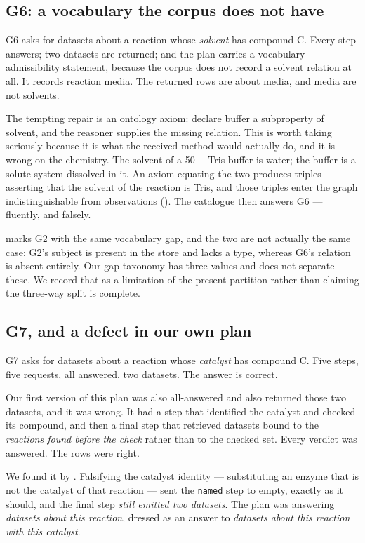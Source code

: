 \documentclass[11pt,a4paper]{article}
\theoremstyle{plain}
\theoremstyle{definition}
\theoremstyle{remark}
\newcommand{\vans}{\textsf{answered}}
\newcommand{\vempty}{\textsf{empty}}
\begin{document}
\subsection{G6: a vocabulary the corpus does not have}
\label{sec:g6}

G6 asks for datasets about a reaction whose \emph{solvent} has compound
C. Every step answers; two datasets are returned; and the plan carries
a \textsf{vocabulary} admissibility statement, because the corpus does
not record a solvent relation at all. It records reaction media. The
returned rows are about media, and media are not solvents.

The tempting repair is an ontology axiom: declare buffer a subproperty
of solvent, and the reasoner supplies the missing relation. This is
worth taking seriously because it is what the received method would
actually do, and it is wrong on the chemistry. The solvent of a
\SI{50}{\milli\Molar} Tris buffer is water; the buffer is a solute
system dissolved in it. An axiom equating the two produces triples
asserting that the solvent of the reaction is Tris, and those triples
enter the graph indistinguishable from observations
(). The catalogue then answers G6 --- fluently, and
falsely.

 marks G2 with the same \textsf{vocabulary} gap, and
the two are not actually the same case: G2's subject is present in the
store and lacks a type, whereas G6's relation is absent entirely.
Our gap taxonomy has three values and does not separate these. We
record that as a limitation of the present partition rather than
claiming the three-way split is complete.

\subsection{G7, and a defect in our own plan}
\label{sec:g7}

G7 asks for datasets about a reaction whose \emph{catalyst} has
compound C. Five steps, five requests, all \vans, two datasets. The
answer is correct.

Our first version of this plan was also all-\vans{} and also returned
those two datasets, and it was wrong. It had a step that identified the
catalyst and checked its compound, and then a final step that retrieved
datasets bound to the \emph{reactions found before the check} rather
than to the checked set. Every verdict was \vans. The rows were right.

We found it by . Falsifying the catalyst
identity --- substituting an enzyme that is not the catalyst of that
reaction --- sent the \texttt{named} step to \vempty{}, exactly as it
should, and the final step \emph{still emitted two datasets}. The plan
was answering \emph{datasets about this reaction}, dressed as an answer
to \emph{datasets about this reaction with this catalyst}.
\end{document}
